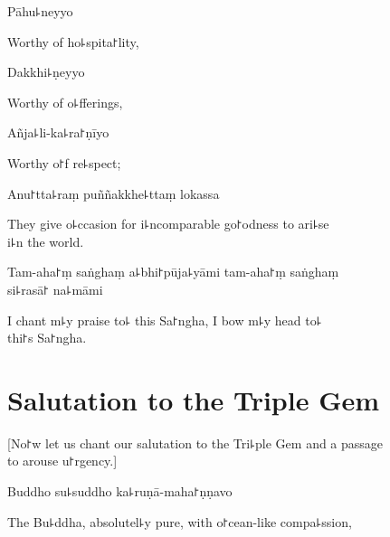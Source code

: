 Pāhu꜕neyyo

\begin{english}
  Worthy of ho꜕spita꜓lity,
\end{english}

\clearpage

Dakkhi꜕ṇeyyo

\begin{english}
  Worthy of o꜕fferings,
\end{english}

Añja꜕li-ka꜕ra꜓ṇīyo

\begin{english}
  Worthy o꜓f re꜕spect;
\end{english}

Anu꜓tta꜕raṃ puññakkhe꜕ttaṃ lokassa

\begin{english}
  They give o꜕ccasion for i꜕ncomparable go꜓odness to ari꜕se \\i꜕n the world.
\end{english}

Tam-aha꜓ṃ saṅghaṃ a꜕bhi꜓pūja꜕yāmi tam-aha꜓ṃ saṅghaṃ \\si꜕rasā꜓ na꜕māmi

\begin{english}
  I chant m꜕y praise to꜕ this Sa꜓ngha, I bow m꜕y head to꜕\\ thi꜓s Sa꜓ngha.
\end{english}

\clearpage

\chapter{Salutation to the Triple Gem}              %

\begin{leader}
\end{leader}

\begin{english}
  [No꜓w let us chant our salutation to the Tri꜕ple Gem and a passage \\to arouse u꜓rgency.]
\end{english}

Buddho su꜕suddho ka꜕ruṇā-maha꜓ṇṇavo

\begin{english}
  The Bu꜕ddha, absolutel꜕y pure, with o꜓cean-like compa꜕ssion,
\end{english}

